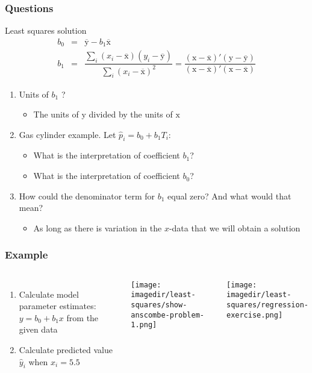 \begin{frame}\frametitle{Questions}
	\begin{block}{Least squares solution}
			$$
			\begin{array}{rcl}
				b_0 &=& \overline{\mathrm{y}} - b_1\overline{\mathrm{x}} \\
				b_1 &=& \dfrac{ \sum_i{\left(x_i - \overline{\mathrm{x}}\right)\left(y_i - \overline{\mathrm{y}}\right) } }{ \sum_i{\left( x_i - \overline{\mathrm{x}}\right)^2} } = \dfrac{\left(\mathrm{x} - \overline{\mathrm{x}}\right)'\left(\mathrm{y} - \overline{\mathrm{y}}\right)}{\left(\mathrm{x} - \overline{\mathrm{x}}\right)'\left(\mathrm{x} - \overline{\mathrm{x}}\right)}
			\end{array}
			$$
	\end{block}
	\begin{enumerate}
		\item	Units of $b_1$ ?
		\begin{itemize}
			\item	The units of $\mathrm{y}$ divided by the units of $\mathrm{x}$
		\end{itemize}
		\item	Gas cylinder example. Let $\hat{p}_i = b_0 + b_1 T_i$:
		\begin{itemize}
			\item	What is the interpretation of coefficient $b_1$?
			\item	What is the interpretation of coefficient $b_0$?
		\end{itemize}
		\item	How could the denominator term for $b_1$ equal zero? And what would that mean?
		\begin{itemize}
			\item	As long as there is variation in the $x$-data that we will obtain a solution
		\end{itemize}
	\end{enumerate}
\end{frame}

\begin{frame}\frametitle{Example}
	\begin{columns}
		\column{5cm}
			\begin{enumerate}
				\item	Calculate model parameter estimates: $y = b_0 + b_1 x$ from the given data
				\item	Calculate predicted value $\hat{y}_i$ when $x_i = 5.5$
			\end{enumerate}
			\begin{center}
				\texttt{[image: \\imagedir/least-squares/show-anscombe-problem-1.png]}
			\end{center}
		\column{5cm}
			\begin{center}
				\texttt{[image: \\imagedir/least-squares/regression-exercise.png]}
			\end{center}
	\end{columns}
\end{frame}

